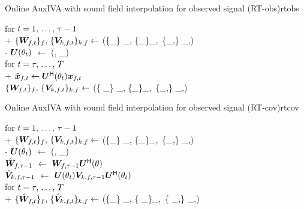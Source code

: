 \documentclass[sip,biber]{now-journal}
\begin{document}
\begin{algorithm}{Online AuxIVA with sound field interpolation for observed signal (RT-obs)}{rtobs}
  \begin{pseudo}
    for $t = 1,\, \dots,\, \tau - 1$ \\+
      $\{\Demix _{\ft}\}_{\freq},\, \{\cov _{\src,\ft}\} _{\src,\freq} \gets$ (\{\Obs _{\ft}\} _{\freq}, \{\Demix _{\ft[-1]}\}_{\freq},\, \{\cov _{\src,\ft[-1]}\} _{\src,\freq}) \\-
    $\bm{U} (\theta _{t})$ $\gets$ (\Mic, \rotSpat _{\tframe}) \\
    for $t = \tau,\, \dots,\, T$ \\+
      $\refpos{\Obs} _{\ft} \gets \rotMat ^{\hermite} (\rotSpat _{\tframe}) \Obs _{\ft}$ \ct{$(\forall \freq)$} \\
      $\{\Demix _{\ft}\}_{\freq},\, \{\cov _{\src,\ft}\} _{\src,\freq} \gets$ (\{ _{\ft}\} _{\freq}, \{\Demix _{\ft[-1]}\}_{\freq},\, \{\cov _{\src,\ft[-1]}\} _{\src,\freq})
  \end{pseudo}
\end{algorithm}
\begin{algorithm}{Online AuxIVA with sound field interpolation for observed signal (RT-cov)}{rtcov}
  \begin{pseudo}
    for $t = 1,\, \dots,\, \tau - 1$ \\+
      $\{\Demix _{\ft}\}_{\freq},\, \{\cov _{\src,\ft}\} _{\src,\freq} \gets$ (\{\Obs _{\ft}\} _{\freq}, \{\Demix _{\ft[-1]}\}_{\freq},\, \{\cov _{\src,\ft[-1]}\} _{\src,\freq}) \\-
    $\bm{U} (\theta _{t})$ $\gets$ (\Mic, \rotSpat _{\tframe}) \\
    {$\hat{\bm{W}} _{f,\tau - 1}$} $\gets$ $\bm{W} _{f,\tau - 1} \bm{U} ^{\mathsf{H}} (\theta)$ \ct{$(\forall \freq)$} \\
    {$\hat{\bm{V}} _{k,f,\tau - 1}$} $\gets$ $\bm{U} (\theta _{t}) \bm{V} _{k,f,\tau - 1} \bm{U} ^{\mathsf{H}} (\theta _{t})$ \ct{$(\forall \src,\freq)$} \\
    for $t = \tau,\, \dots,\, T$ \\+
      $\{\rot{\Demix} _{\ft}\}_{\freq},\, \{\rot{\cov} _{\src,\ft}\} _{\src,\freq} \gets$ (\{\Obs _{\ft}\} _{\freq}, \{\rot{\Demix} _{\ft[-1]}\}_{\freq},\, \{\rot{\cov} _{\src,\ft[-1]}\} _{\src,\freq})
  \end{pseudo}
\end{algorithm}
\end{document}
